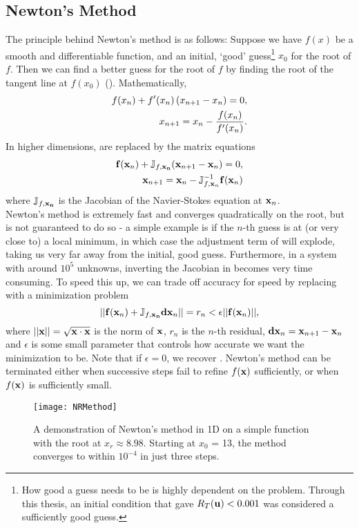 \subsection{Newton's Method}
The principle behind Newton's method is as follows: Suppose we have $f(x)$ be a smooth and differentiable function, and an initial, `good' guess\footnote{How good a guess needs to be is highly dependent on the problem. Through this thesis, an initial condition that gave $R_T(\mathbf{u}) < 0.001$ was considered a sufficiently good guess.}  $x_0$ for the root of $f$. Then we can find a better guess for the root of $f$ by finding the root of the tangent line at $f(x_0)$ (). Mathematically, 
\begin{align}
f(x_n) + f'(x_n)\left ( x_{n+1} - x_n \right ) = 0,\label{eq:NRS1D}\\ 
x_{n+1} = x_n - \dfrac{f(x_n)}{f'(x_n)}.\label{eq:NR1D}
\end{align}
In higher dimensions,  are replaced by the matrix equations
\begin{align}
\mathbf{f}(\mathbf{x}_n) + \mathbb{J}_{f,\mathbf{x_n}}(\mathbf{x}_{n+1} - \mathbf{x}_n) = 0,\label{eq:NRSND}\\
\mathbf{x}_{n+1} = \mathbf{x}_n - \mathbb{J}_{f,\mathbf{x}_n}^{-1}\mathbf{f}(\mathbf{x}_n)
\end{align}
where $\mathbb{J}_{f,\mathbf{x_n}}$ is the Jacobian of the Navier-Stokes equation at $\mathbf{x}_n$.\\
 
Newton's method is extremely fast and converges quadratically on the root, but is not guaranteed to do so - a simple example is if the $n$-th guess is at (or very close to) a local minimum, in which case the adjustment term of  will explode, taking us very far away from the initial, good guess. Furthermore, in a system with around $10^5$ unknowns, inverting the Jacobian in  becomes very time consuming. To speed this up, we can trade off accuracy for speed by replacing    with a minimization problem
\begin{equation}
||\mathbf{f}(\mathbf{x}_n) + \mathbb{J}_{f,\mathbf{x_n}}\mathbf{dx}_n|| = r_n< \epsilon ||\mathbf{f}(\mathbf{x}_n)||,
\end{equation}
where $||\mathbf{x}|| = \sqrt{\mathbf{x} \cdot \mathbf{x}}$ is the norm of $\mathbf{x}$, $r_n$ is the $n$-th residual, $\mathbf{dx}_n = \mathbf{x}_{n+1} - \mathbf{x}_n$ and $\epsilon$ is some small parameter that controls how accurate we want the minimization to be. Note that if $\epsilon = 0$, we recover . Newton's method can be terminated either when successive steps fail to refine $f(\mathbf{x})$ sufficiently, or when $f(\mathbf{x})$ is sufficiently small.
\begin{figure}[h]
\texttt{[image: NRMethod]}
\caption{A demonstration of Newton's method in 1D on a simple function with the root at $x_r \approx 8.98$. Starting at $x_0$ = 13, the method converges to within $10^{-4}$ in just three steps.}\label{fig:Newton}
\end{figure}  
